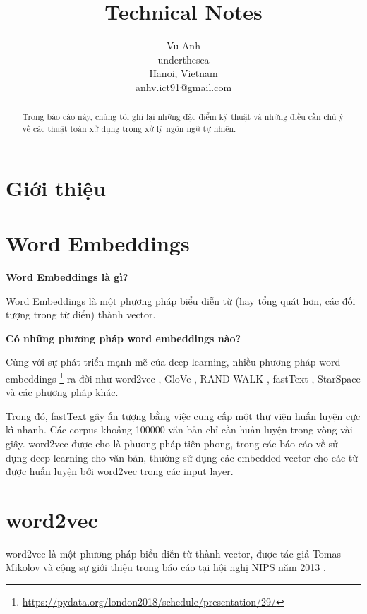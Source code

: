 \documentclass[11pt,a4paper]{article}
\title{Technical Notes}
\author{
Vu Anh\\
underthesea\\
Hanoi, Vietnam\\
anhv.ict91@gmail.com
}
\date{}
\begin{document}
\maketitle
\begin{abstract}
Trong báo cáo này, chúng tôi ghi lại những đặc điểm kỹ thuật và những điều cần chú ý về các thuật toán xử dụng trong xử lý ngôn ngữ tự nhiên.

\end{abstract}

\section{Giới thiệu}

\section{Word Embeddings}

\textbf{Word Embeddings là gì?}

Word Embeddings là một phương pháp biểu diễn từ (hay tổng quát hơn, các đối tượng trong từ điển) thành vector.

\textbf{Có những phương pháp word embeddings nào?}

Cùng với sự phát triển mạnh mẽ của deep learning, nhiều phương pháp word embeddings \footnote{\href{Beyond word2vec: GloVe, fastText, StarSpace. Konstantinos Perifanos. pydata 2018}{https://pydata.org/london2018/schedule/presentation/29/}} ra đời như word2vec \cite{DBLP:conf/nips/MikolovSCCD13}, GloVe \cite{DBLP:conf/emnlp/PenningtonSM14}, RAND-WALK \cite{DBLP:journals/corr/AroraLLMR15}, fastText \cite{DBLP:conf/eacl/GraveMJB17}, StarSpace \cite{DBLP:conf/aaai/WuFCABW18} và các phương pháp khác.

Trong đó, fastText gây ấn tượng bằng việc cung cấp một thư viện huấn luyện cực kì nhanh. Các corpus khoảng 100000 văn bản chỉ cần huấn luyện trong vòng vài giây. word2vec được cho là phương pháp tiên phong, trong các báo cáo về sử dụng deep learning cho văn bản, thường sử dụng các embedded vector cho các từ được huấn luyện bởi word2vec trong các input layer.

\section{word2vec}

word2vec là một phương pháp biểu diễn từ thành vector, được tác giả Tomas Mikolov và cộng sự giới thiệu trong báo cáo tại hội nghị NIPS năm 2013 \cite{DBLP:conf/nips/MikolovSCCD13}.
\end{document}
